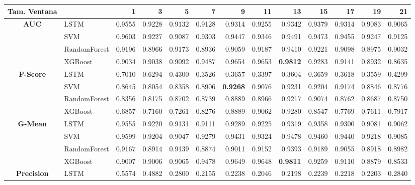 \begin{table}[h]
	\centering
	\begin{adjustbox}{max width=15cm}
		\begin{tabular}{|c|l|r|r|r|r|r|r|r|r|r|r|r|}
			\hline
			\textbf{Tam. Ventana}&         &      1  &      3  &      5  &      7  &      9  &      11 &      13 &      15 &      17 &      19 &      21 \\
			\hline
			\textbf{AUC} & LSTM &  0.9555 &  0.9228 &  0.9132 &  0.9128 &  0.9314 &  0.9255 &  0.9342 &  0.9379 &  0.9314 &  0.9083 &  0.9065 \\
			& SVM &  0.9603 &  0.9227 &  0.9087 &  0.9303 &  0.9447 &  0.9346 &  0.9491 &  0.9473 &  0.9455 &  0.9247 &  0.9125 \\
			& RandomForest &  0.9196 &  0.8966 &  0.9173 &  0.8936 &  0.9059 &  0.9187 &  0.9410 &  0.9221 &  0.9098 &  0.8975 &  0.9032 \\
			& XGBoost &  0.9034 &  0.9038 &  0.9092 &  0.9487 &  0.9654 &  0.9653 &  \textbf{0.9812} &  0.9283 &  0.9141 &  0.8932 &  0.8635 \\
			\hline
			\textbf{F-Score} & LSTM &  0.7010 &  0.6294 &  0.4300 &  0.3526 &  0.3657 &  0.3397 &  0.3604 &  0.3659 &  0.3618 &  0.3559 &  0.4299 \\
			& SVM &  0.8645 &  0.8054 &  0.8358 &  0.8906 &  \textbf{0.9268} &  0.9076 &  0.9231 &  0.9204 &  0.9174 &  0.8846 &  0.8776 \\
			& RandomForest &  0.8356 &  0.8175 &  0.8702 &  0.8739 &  0.8889 &  0.8966 &  0.9217 &  0.9074 &  0.8762 &  0.8687 &  0.8750 \\
			& XGBoost &  0.6857 &  0.7160 &  0.7261 &  0.8276 &  0.8889 &  0.9062 &  0.9280 &  0.8547 &  0.7769 &  0.7611 &  0.7917 \\
			\hline
			\textbf{G-Mean} & LSTM &  0.9555 &  0.9220 &  0.9131 &  0.9111 &  0.9289 &  0.9225 &  0.9319 &  0.9358 &  0.9300 &  0.9081 &  0.9062 \\
			& SVM &  0.9599 &  0.9204 &  0.9047 &  0.9279 &  0.9431 &  0.9324 &  0.9478 &  0.9460 &  0.9440 &  0.9218 &  0.9085 \\
			& RandomForest &  0.9167 &  0.8914 &  0.9139 &  0.8874 &  0.9011 &  0.9152 &  0.9393 &  0.9189 &  0.9055 &  0.8918 &  0.8982 \\
			& XGBoost &  0.9007 &  0.9006 &  0.9065 &  0.9478 &  0.9649 &  0.9648 &  \textbf{0.9811} &  0.9259 &  0.9110 &  0.8879 &  0.8533 \\
			\hline
			\textbf{Precision} & LSTM &  0.5574 &  0.4882 &  0.2800 &  0.2155 &  0.2238 &  0.2046 &  0.2198 &  0.2239 &  0.2218 &  0.2203 &  0.2840 \\

\end{tabular}
\end{adjustbox}
\end{table}
